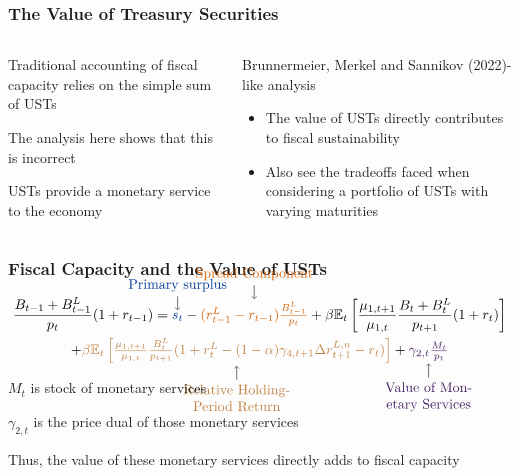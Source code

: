 \documentclass[11pt, handout, aspectratio=169]{beamer}
\newenvironment{wideitemize}{\itemize\addtolength{\itemsep}{10pt}}{\enditemize}
\newcommand\mathcomment[2]{
	\tikz[baseline]{\node[anchor=base,inner sep=0pt,outer sep=2pt] (myterm) {$#1$};
	\node[overlay,anchor=south,yshift=1em] (mycomment) at (myterm.north) {#2};
	\draw[overlay,->] (mycomment.south) -- (myterm.north);
	}
}
\newcommand\mathcommentbelow[2]{
	\tikz[baseline]{\node[anchor=base,inner sep=0pt,outer sep=2pt] (myterm) {$#1$};
	\node[overlay,anchor=north,yshift=-1em, text width=3cm,align=center] (mycomment) at (myterm.south) {#2};
	\draw[overlay,->] (mycomment.north) -- (myterm.south);
}
}
\begin{document}
\begin{frame}
\frametitle{The Value of Treasury Securities}
\begin{columns}[t]
	\begin{column}{.45\textwidth}
		\begin{wideitemize}
			\item Traditional accounting of fiscal capacity relies on the simple sum of USTs
			\item The analysis here shows that this is incorrect
			\item USTs provide a monetary service to the economy
		\end{wideitemize}
	\end{column}
	\begin{column}{.55\textwidth}
		\begin{wideitemize}
			\item Brunnermeier, Merkel and Sannikov (2022)-like analysis
			\item {\bf \color{WeberPurple}{Contribution}}
			\begin{itemize}
				\item The value of USTs directly contributes to fiscal sustainability
				\item Also see the tradeoffs faced when considering a portfolio of USTs with varying maturities
			\end{itemize}
		\end{wideitemize}
	\end{column}
\end{columns}
\end{frame}

\begin{frame}
\frametitle{Fiscal Capacity and the Value of USTs}
\begin{multline*}
	\frac{B_{t-1} + B^L_{t-1}}{p_t}(1+r_{t-1})= \mathcomment{\color{blue}{s_t}}{\color{blue}{Primary surplus}}  - \mathcomment{\color{red}{(r_{t-1}^L - r_{t-1})\frac{B^L_{t-1}}{p_t}}}{\color{red}{Spread Component}} + \beta\mathbb{E}_t\left[\frac{\mu_{1,t+1}}{\mu_{1,t}} \frac{B_{t} +B^L_{t}}{p_{t+1}}(1+r_{t})\right] \\ 
		+ \mathcommentbelow{\color{brown}{\beta\mathbb{E}_t\left[\frac{\mu_{1,t+1}}{\mu_{1,t}} \frac{B^L_{t}}{p_{t+1}}(1+r^L_{t} - (1-\alpha)\gamma_{4,t+1}\Delta r^{L,n}_{t+1} - r_t)\right]}}{\color{brown}{Relative Holding-Period Return}} 
		+  \mathcommentbelow{\color{WeberPurple}{\gamma_{2,t}\frac{M_t}{p_t}}}{\color{WeberPurple}{Value of Monetary Services}}
	\label{eq:fiscalcapacity}
\end{multline*}
\vfill
\begin{wideitemize}
	\item $M_t$ is stock of monetary services
	\item $\gamma_{2,t}$ is the price dual of those monetary services
	\item Thus, the value of these monetary services directly adds to fiscal capacity
\end{wideitemize}
\end{frame}
\end{document}
